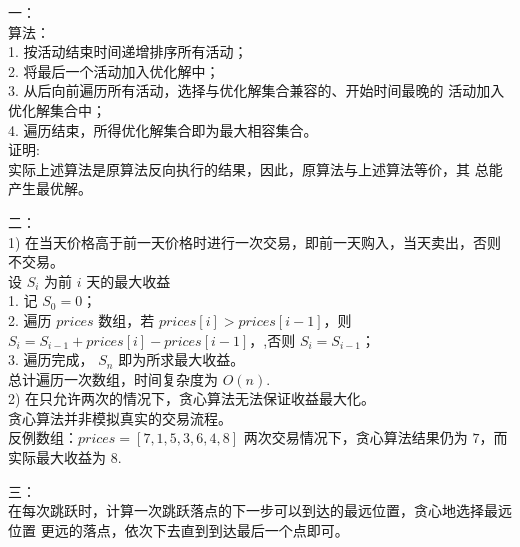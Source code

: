 \documentclass{article}
\begin{document}
一：\\
算法：\\
1. 按活动结束时间递增排序所有活动；\\
2. 将最后一个活动加入优化解中；\\
3. 从后向前遍历所有活动，选择与优化解集合兼容的、开始时间最晚的
活动加入优化解集合中；\\
4. 遍历结束，所得优化解集合即为最大相容集合。\\
证明:\\
实际上述算法是原算法反向执行的结果，因此，原算法与上述算法等价，其
总能产生最优解。

\newpage
二：\\
1)
在当天价格高于前一天价格时进行一次交易，即前一天购入，当天卖出，否则不交易。 \\
设 $S_i$ 为前 $i$ 天的最大收益 \\
1. 记 $S_0 = 0$；\\
2. 遍历 $prices$ 数组，若 $prices[i] > prices[i-1]$，则 $S_i = S_{i-1} 
+ prices[i] - prices[i - 1]$，,否则 $S_i = S_{i - 1}$；\\
3. 遍历完成， $S_n$ 即为所求最大收益。 \\
总计遍历一次数组，时间复杂度为 $O(n)$. \\
2) 
在只允许两次的情况下，贪心算法无法保证收益最大化。\\
贪心算法并非模拟真实的交易流程。\\
反例数组：$prices = [7, 1, 5, 3, 6, 4, 8]$
两次交易情况下，贪心算法结果仍为 $7$，而实际最大收益为 $8$.

\newpage
三：\\
在每次跳跃时，计算一次跳跃落点的下一步可以到达的最远位置，贪心地选择最远位置
更远的落点，依次下去直到到达最后一个点即可。\\
\end{document}
